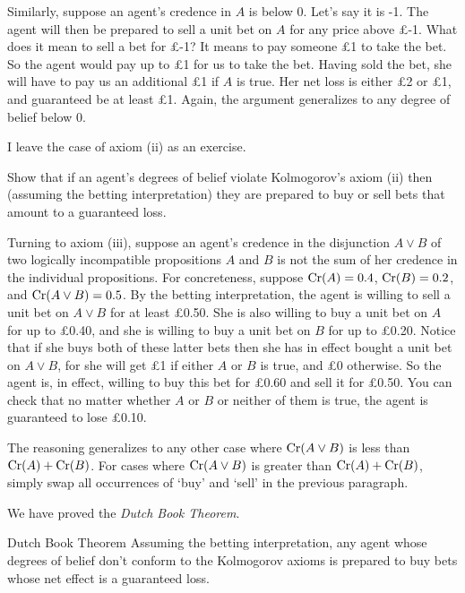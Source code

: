 Similarly, suppose an agent's credence in $A$ is below 0. Let's say it is -1.
The agent will then be prepared to sell a unit bet on $A$ for any price above
£-1. What does it mean to sell a bet for £-1? It means to pay someone £1 to take
the bet. So the agent would pay up to £1 for us to take the bet. Having sold the
bet, she will have to pay us an additional £1 if $A$ is true. Her net loss is
either £2 or £1, and guaranteed be at least £1. Again, the argument generalizes
to any degree of belief below 0.

I leave the case of axiom (ii) as an exercise.

\begin{exercise}{2}
  Show that if an agent's degrees of belief violate Kolmogorov's axiom (ii) then
  (assuming the betting interpretation) they are prepared to buy or sell bets
  that amount to a guaranteed loss.
\end{exercise}

Turning to axiom (iii), suppose an agent's credence in the disjunction
$A \lor B$ of two logically incompatible propositions $A$ and $B$ is not the sum
of her credence in the individual propositions. For concreteness, suppose
$\text{Cr}(A) = 0.4$, $\text{Cr}(B) = 0.2$, and $\text{Cr}(A \lor B) = 0.5$. By the betting
interpretation, the agent is willing to sell a unit bet on $A \lor B$ for at
least £0.50. She is also willing to buy a unit bet on $A$ for up to £0.40, and
she is willing to buy a unit bet on $B$ for up to £0.20. Notice that if she buys
both of these latter bets then she has in effect bought a unit bet on
$A \lor B$, for she will get £1 if either $A$ or $B$ is true, and £0 otherwise.
So the agent is, in effect, willing to buy this bet for £0.60 and sell it for
£0.50. You can check that no matter whether $A$ or $B$ or neither of them is
true, the agent is guaranteed to lose £0.10.

The reasoning generalizes to any other case where $\text{Cr}(A \lor B)$ is less than
$\text{Cr}(A) + \text{Cr}(B)$. For cases where $\text{Cr}(A \lor B)$ is greater than
$\text{Cr}(A) + \text{Cr}(B)$, simply swap all occurrences of `buy' and `sell' in the
previous paragraph.

We have proved the \emph{Dutch Book Theorem}.

\begin{genericthm}{Dutch Book Theorem}
  Assuming the betting interpretation, any agent whose degrees of belief don't
  conform to the Kolmogorov axioms is prepared to buy bets whose net effect is a
  guaranteed loss.
\end{genericthm}

